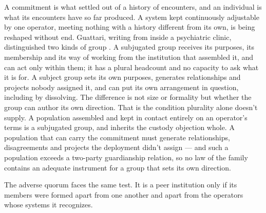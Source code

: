
A commitment is what settled out of a history of encounters, and an individual is what its encounters have so far produced. A system kept continuously adjustable by one operator, meeting nothing with a history different from its own, is being reshaped without end. Guattari, writing from inside a psychiatric clinic, distinguished two kinds of group \autocite{guattari2015transversality}. A subjugated group receives its purposes, its membership and its way of working from the institution that assembled it, and can act only within them; it has a plural headcount and no capacity to ask what it is for. A subject group sets its own purposes, generates relationships and projects nobody assigned it, and can put its own arrangement in question, including by dissolving. The difference is not size or formality but whether the group can author its own direction. That is the condition plurality alone doesn't supply. A population assembled and kept in contact entirely on an operator's terms is a subjugated group, and inherits the custody objection whole. A population that can carry the commitment must generate relationships, disagreements and projects the deployment didn't assign — and such a population exceeds a two-party guardianship relation, so no law of the family contains an adequate instrument for a group that sets its own direction.

The adverse quorum faces the same test. It is a peer institution only if its members were formed apart from one another and apart from the operators whose systems it recognizes.
